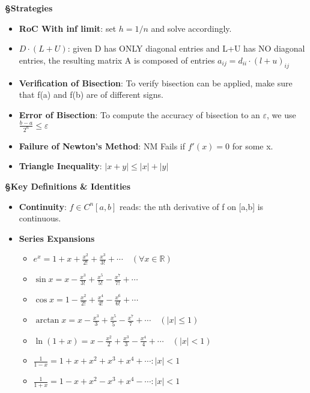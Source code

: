 \documentclass{article}
\begin{document}
\begin{tcolorbox}[colframe=black,colback=white,boxrule=0.3pt,arc=1pt,
left=0pt,right=0pt,top=0pt,bottom=0pt]
\begin{minipage}[t]{0.49\textwidth}
\textbf{\S Strategies}
\begin{itemize}
    \item \textbf{RoC With inf limit}: set $h=1/n$ and solve accordingly. 
    \item \textbf{$D\cdot (L+U)$}: given D has ONLY diagonal entries and L+U has NO diagonal entries, the resulting matrix A is composed of entries $a_{ij}=d_{ii}\cdot (l+u)_{ij}$
    \item \textbf{Verification of Bisection}: To verify bisection can be applied, make sure that f(a) and f(b) are of different signs.
    \item \textbf{Error of Bisection}: To compute the accuracy of bisection to an $\varepsilon$, we use $\frac{b-a}{2^n}\le 
    \varepsilon$
    \item \textbf{Failure of Newton's Method}: NM Fails if $f'(x)=0$ for some x.
    \item \textbf{Triangle Inequality}: $|x+y|\le |x|+|y|$
\end{itemize}

\textbf{\S Key Definitions \& Identities}
\begin{itemize}
    \item \textbf{Continuity}: $f\in C^n[a,b]$ reads: the nth derivative of f on [a,b] is continuous.
    \item \textbf{Series Expansions}
    \begin{itemize}
        \item $e^x = 1 + x + \frac{x^2}{2!} + \frac{x^3}{3!} + \cdots \quad (\forall x \in \mathbb{R})$
        \item $\sin x = x - \frac{x^3}{3!} + \frac{x^5}{5!} - \frac{x^7}{7!} + \cdots$
        \item $\cos x = 1 - \frac{x^2}{2!} + \frac{x^4}{4!} - \frac{x^6}{6!} + \cdots$
        \item $\arctan x = x - \frac{x^3}{3} + \frac{x^5}{5} - \frac{x^7}{7} + \cdots \quad (|x| \leq 1)$
        \item $\ln(1+x) = x - \frac{x^2}{2} + \frac{x^3}{3} - \frac{x^4}{4} + \cdots \quad (|x| < 1)$
        \item $\frac{1}{1-x}=1+x+x^2+x^3+x^4+\cdots: |x|<1$
        \item $\frac{1}{1+x}=1-x+x^2-x^3+x^4-\cdots: |x|<1$
    \end{itemize}
    

\end{itemize}
\end{minipage}
\end{tcolorbox}
\end{document}
